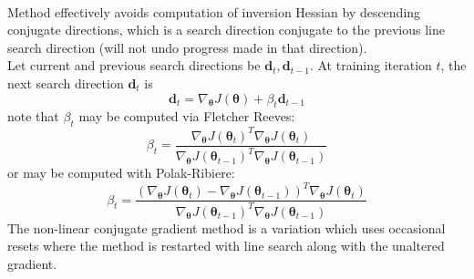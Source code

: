 \begin{remark} \\
Method effectively avoids computation of inversion Hessian by descending conjugate directions, which is a search direction conjugate to the previous line search direction (will not undo progress made in that direction).\\
Let current and previous search directions be $\bm{d}_{t}, \bm{d}_{t-1}$. At training iteration $t$, the next search direction $\bm{d}_t$ is
\begin{equation*}
\bm{d}_t = \nabla_{\bm{\theta}} J(\bm{\theta}) + \beta_t \bm{d}_{t-1} \nonumber
\end{equation*}
note that $\beta_t$ may be computed via Fletcher Reeves:
\begin{equation*}
\beta_t = \frac{\nabla_{\bm{\theta}} J(\bm{\theta}_t)^T \nabla_{\bm{\theta}} J(\bm{\theta}_t)}{\nabla_{\bm{\theta}} J(\bm{\theta}_{t-1})^T \nabla_{\bm{\theta}} J(\bm{\theta}_{t-1})} \nonumber
\end{equation*}
or may be computed with Polak-Ribiere:
\begin{equation*}
\beta_t = \frac{(\nabla_{\bm{\theta}} J(\bm{\theta}_t) - \nabla_{\bm{\theta}} J(\bm{\theta}_{t-1}))^T \nabla_{\bm{\theta}} J(\bm{\theta}_t)}{\nabla_{\bm{\theta}} J(\bm{\theta}_{t-1})^T \nabla_{\bm{\theta}} J(\bm{\theta}_{t-1})} \nonumber
\end{equation*}
The non-linear conjugate gradient method is a variation which uses occasional resets where the method is restarted with line search along with the unaltered gradient.
\end{remark}

